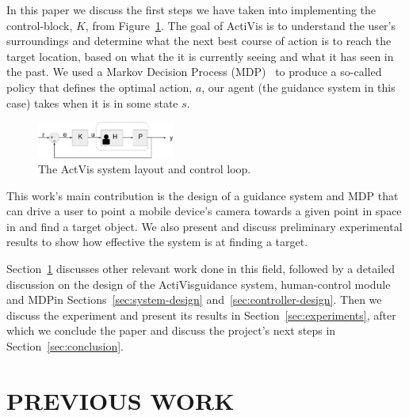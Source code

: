\documentclass[a4paper, twoside]{article}
\begin{document}
In this paper we discuss the first steps we have taken into implementing the control-block, $K$, from Figure~\ref{fig:control-loop}. The goal of ActiVis is to understand the user's surroundings and determine what the next best course of action is to reach the target location, based on what the it is currently seeing and what it has seen in the past. We used a Markov Decision Process (MDP)~\cite{bellman1957markovian} to produce a so-called policy that defines the optimal action, $a$, our agent (the guidance system in this case) takes when it is in some state $s$.  

\begin{figure}
  \centering
  \includegraphics[width=0.4\textwidth]{figures/control_loop.png}
  \caption{The ActVis system layout and control loop. }\label{fig:control-loop}
\end{figure}


This work's main contribution is the design of a guidance system and MDP that can drive a user to point a mobile device's camera towards a given point in space in and find a target object. We also present and discuss preliminary experimental results to show how effective the system is at finding a target.

Section~\ref{sec:previous-work} discusses other relevant work done in this field, followed by a detailed discussion on the design of the ActiVisguidance  system, human-control module and MDP\@ in Sections~\ref{sec:system-design} and~\ref{sec:controller-design}. Then we discuss the experiment and present its results in Section~\ref{sec:experiments}, after which we conclude the paper and discuss the project's next steps in Section~\ref{sec:conclusion}. 

\section{\uppercase{Previous Work}}\label{sec:previous-work}
\end{document}
